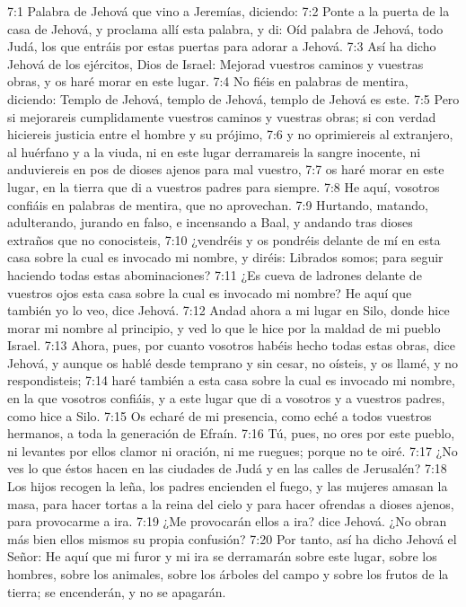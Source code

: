 7:1 Palabra de Jehová que vino a Jeremías, diciendo: 
7:2 Ponte a la puerta de la casa de Jehová, y proclama allí esta palabra, y di: Oíd palabra de Jehová, todo Judá, los que entráis por estas puertas para adorar a Jehová. 
7:3 Así ha dicho Jehová de los ejércitos, Dios de Israel: Mejorad vuestros caminos y vuestras obras, y os haré morar en este lugar. 
7:4 No fiéis en palabras de mentira, diciendo: Templo de Jehová, templo de Jehová, templo de Jehová es este. 
7:5 Pero si mejorareis cumplidamente vuestros caminos y vuestras obras; si con verdad hiciereis justicia entre el hombre y su prójimo, 
7:6 y no oprimiereis al extranjero, al huérfano y a la viuda, ni en este lugar derramareis la sangre inocente, ni anduviereis en pos de dioses ajenos para mal vuestro, 
7:7 os haré morar en este lugar, en la tierra que di a vuestros padres para siempre. 
7:8 He aquí, vosotros confiáis en palabras de mentira, que no aprovechan. 
7:9 Hurtando, matando, adulterando, jurando en falso, e incensando a Baal, y andando tras dioses extraños que no conocisteis, 
7:10 ¿vendréis y os pondréis delante de mí en esta casa sobre la cual es invocado mi nombre, y diréis: Librados somos; para seguir haciendo todas estas abominaciones? 
7:11 ¿Es cueva de ladrones delante de vuestros ojos esta casa sobre la cual es invocado mi nombre? He aquí que también yo lo veo, dice Jehová. 
7:12 Andad ahora a mi lugar en Silo, donde hice morar mi nombre al principio, y ved lo que le hice por la maldad de mi pueblo Israel. 
7:13 Ahora, pues, por cuanto vosotros habéis hecho todas estas obras, dice Jehová, y aunque os hablé desde temprano y sin cesar, no oísteis, y os llamé, y no respondisteis; 
7:14 haré también a esta casa sobre la cual es invocado mi nombre, en la que vosotros confiáis, y a este lugar que di a vosotros y a vuestros padres, como hice a Silo. 
7:15 Os echaré de mi presencia, como eché a todos vuestros hermanos, a toda la generación de Efraín. 
7:16 Tú, pues, no ores por este pueblo, ni levantes por ellos clamor ni oración, ni me ruegues; porque no te oiré. 
7:17 ¿No ves lo que éstos hacen en las ciudades de Judá y en las calles de Jerusalén? 
7:18 Los hijos recogen la leña, los padres encienden el fuego, y las mujeres amasan la masa, para hacer tortas a la reina del cielo y para hacer ofrendas a dioses ajenos, para provocarme a ira. 
7:19 ¿Me provocarán ellos a ira? dice Jehová. ¿No obran más bien ellos mismos su propia confusión? 
7:20 Por tanto, así ha dicho Jehová el Señor: He aquí que mi furor y mi ira se derramarán sobre este lugar, sobre los hombres, sobre los animales, sobre los árboles del campo y sobre los frutos de la tierra; se encenderán, y no se apagarán. 
